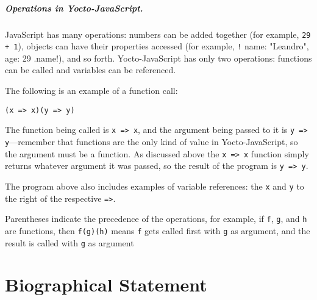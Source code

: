 \documentclass[12pt, oneside]{book}
\begin{document}
\paragraph{Operations in Yocto-JavaScript.}

JavaScript has many operations: numbers can be added together (for example, \texttt{29 + 1}), objects can have their properties accessed (for example, \texttt!{ name: "Leandro", age: 29 }.name!), and so forth. Yocto-JavaScript has only two operations: functions can be called and variables can be referenced.

The following is an example of a function call:

\begin{verbatim}
(x => x)(y => y)
\end{verbatim}

The function being called is \texttt{x => x}, and the argument being passed to it is \texttt{y => y}—remember that functions are the only kind of value in Yocto-JavaScript, so the argument must be a function. As discussed above the \texttt{x => x} function simply returns whatever argument it was passed, so the result of the program is \texttt{y => y}.

The program above also includes examples of variable references: the \texttt{x} and \texttt{y} to the right of the respective \texttt{=>}.

Parentheses indicate the precedence of the operations, for example, if \texttt{f}, \texttt{g}, and \texttt{h} are functions, then \texttt{f(g)(h)} means \texttt{f} gets called first with \texttt{g} as argument, and the result is called with \texttt{g} as argument


\appendix


\backmatter




\chapter{Biographical Statement}

\end{document}
